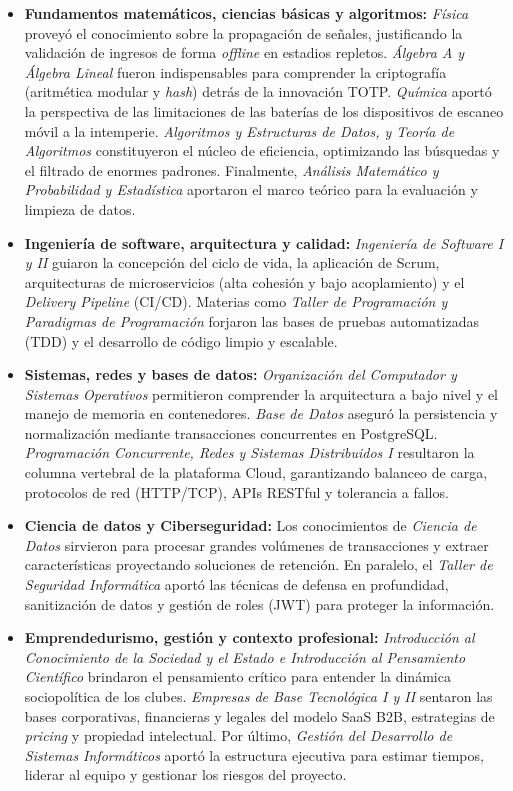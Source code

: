 \documentclass[conference, a4paper]{IEEEtran}
\begin{document}
\begin{itemize}
    \item \textbf{Fundamentos matem\'aticos, ciencias b\'asicas y algoritmos:} \textit{F\'isica} provey\'o el conocimiento sobre la propagaci\'on de se\~nales, justificando la validaci\'on de ingresos de forma \textit{offline} en estadios repletos. \textit{\'Algebra A y \'Algebra Lineal} fueron indispensables para comprender la criptograf\'ia (aritm\'etica modular y \textit{hash}) detr\'as de la innovaci\'on TOTP. \textit{Qu\'imica} aport\'o la perspectiva de las limitaciones de las bater\'ias de los dispositivos de escaneo m\'ovil a la intemperie. \textit{Algoritmos y Estructuras de Datos, y Teor\'ia de Algoritmos} constituyeron el n\'ucleo de eficiencia, optimizando las b\'usquedas y el filtrado de enormes padrones. Finalmente, \textit{An\'alisis Matem\'atico y Probabilidad y Estad\'istica} aportaron el marco te\'orico para la evaluaci\'on y limpieza de datos.
    \item \textbf{Ingenier\'ia de software, arquitectura y calidad:} \textit{Ingenier\'ia de Software I y II} guiaron la concepci\'on del ciclo de vida, la aplicaci\'on de Scrum, arquitecturas de microservicios (alta cohesi\'on y bajo acoplamiento) y el \textit{Delivery Pipeline} (CI/CD). Materias como \textit{Taller de Programaci\'on y Paradigmas de Programaci\'on} forjaron las bases de pruebas automatizadas (TDD) y el desarrollo de c\'odigo limpio y escalable.
    \item \textbf{Sistemas, redes y bases de datos:} \textit{Organizaci\'on del Computador y Sistemas Operativos} permitieron comprender la arquitectura a bajo nivel y el manejo de memoria en contenedores. \textit{Base de Datos} asegur\'o la persistencia y normalizaci\'on mediante transacciones concurrentes en PostgreSQL. \textit{Programaci\'on Concurrente, Redes y Sistemas Distribuidos I} resultaron la columna vertebral de la plataforma Cloud, garantizando balanceo de carga, protocolos de red (HTTP/TCP), APIs RESTful y tolerancia a fallos.
    \item \textbf{Ciencia de datos y Ciberseguridad:} Los conocimientos de \textit{Ciencia de Datos} sirvieron para procesar grandes vol\'umenes de transacciones y extraer caracter\'isticas proyectando soluciones de retenci\'on. En paralelo, el \textit{Taller de Seguridad Inform\'atica} aport\'o las t\'ecnicas de defensa en profundidad, sanitizaci\'on de datos y gesti\'on de roles (JWT) para proteger la informaci\'on.
    \item \textbf{Emprendedurismo, gesti\'on y contexto profesional:} \textit{Introducci\'on al Conocimiento de la Sociedad y el Estado e Introducci\'on al Pensamiento Cient\'ifico} brindaron el pensamiento cr\'itico para entender la din\'amica sociopol\'itica de los clubes. \textit{Empresas de Base Tecnol\'ogica I y II} sentaron las bases corporativas, financieras y legales del modelo SaaS B2B, estrategias de \textit{pricing} y propiedad intelectual. Por \'ultimo, \textit{Gesti\'on del Desarrollo de Sistemas Inform\'aticos} aport\'o la estructura ejecutiva para estimar tiempos, liderar al equipo y gestionar los riesgos del proyecto.
\end{itemize}
\end{document}
